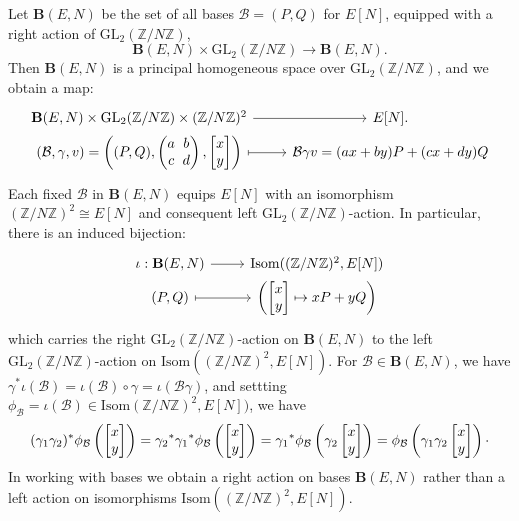 \documentclass{amsart}
\newcommand{\cB}{\mathcal{B}}
\newcommand{\BB}{\mathbf{B}}
\newcommand{\ZZ}{\mathbb{Z}}
\newcommand{\GL}{\mathrm{GL}}
\newcommand{\Isom}{\mathrm{Isom}}
\newcommand{\isom}{\cong}
\newcommand{\Group}{G}
\begin{document}
Let $\BB(E,N)$ be the set of all bases $\cB = (P,Q)$ for $E[N]$,
equipped with a right action of $\GL_2(\ZZ/N\ZZ)$,
$$
\BB(E,N) \times \GL_2(\ZZ/N\ZZ) \longrightarrow \BB(E,N).
$$
Then $\BB(E,N)$ is a principal homogeneous space over $\GL_2(\ZZ/N\ZZ)$,
and we obtain a map:
$$
\begin{tikzcd}[row sep=0mm]
  \BB(E,N) \times \GL_2(\ZZ/N\ZZ) \times (\ZZ/N\ZZ)^2 \arrow[r] & E[N].\\
  (\cB,\gamma,v) =
  \left(
    (P,Q),
    \left(\begin{array}{@{}c@{\;}c@{\;}c@{}}a&b\\c&d\end{array}\right),
    \left[\begin{array}{@{}c@{}}x\\y\end{array}\right]
    \right)
  \arrow[r,mapsto] & \cB \gamma v = (ax + by)P + (cx + dy)Q
\end{tikzcd}
$$
Each fixed $\cB$ in $\BB(E,N)$ equips $E[N]$ with an isomorphism
$(\ZZ/N\ZZ)^2 \isom E[N]$ and consequent left $\GL_2(\ZZ/N\ZZ)$-action.
In particular, there is an induced bijection:
$$
\begin{tikzcd}[row sep=0mm]
  \iota: \BB(E,N) \arrow[r] & \Isom((\ZZ/N\ZZ)^2,E[N])\\
  (P,Q) \arrow[r,mapsto] & 
    \left(\left[\begin{array}{@{}c@{}}x\\y\end{array}\right] \mapsto xP + yQ\right)
\end{tikzcd}
$$
which carries the right $\GL_2(\ZZ/N\ZZ)$-action on $\BB(E,N)$ to the
left $\GL_2(\ZZ/N\ZZ)$-action on $\Isom((\ZZ/N\ZZ)^2,E[N])$.
For $\cB \in \BB(E,N)$, we have
$\gamma^* \iota(\cB) = \iota(\cB) \circ \gamma = \iota(\cB \gamma)$,
and settting $\phi_\cB = \iota(\cB) \in \Isom(\ZZ/N\ZZ)^2,E[N])$, we have
$$
(\gamma_1\gamma_2)^*\phi_\cB\left(\left[\begin{array}{@{}c@{}}x\\y\end{array}\right]\right)
= {\gamma_2}^*{\gamma_1}^*\phi_\cB\left(\left[\begin{array}{@{}c@{}}x\\y\end{array}\right]\right)
= {\gamma_1}^*\phi_\cB\left(\gamma_2\left[\begin{array}{@{}c@{}}x\\y\end{array}\right]\right)
= \phi_\cB\left(\gamma_1\gamma_2\left[\begin{array}{@{}c@{}}x\\y\end{array}\right]\right)\cdot
$$
In working with bases we obtain a right action on bases $\BB(E,N)$ rather than a left
action on isomorphisms $\Isom((\ZZ/N\ZZ)^2,E[N])$.
\end{document}
